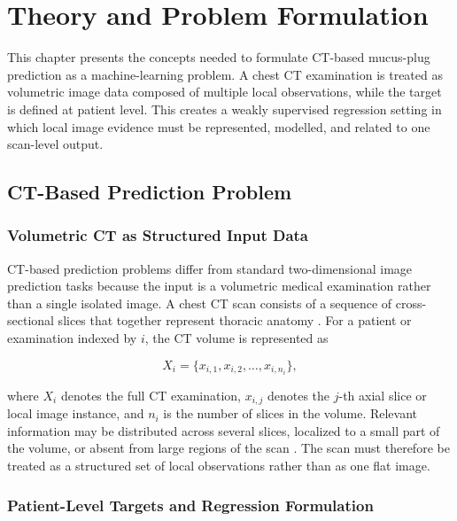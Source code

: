 \chapter{Theory and Problem Formulation}
\label{chap:theory}

This chapter presents the concepts needed to formulate CT-based mucus-plug prediction as a machine-learning problem. A chest CT examination is treated as volumetric image data composed of multiple local observations, while the target is defined at patient level. This creates a weakly supervised regression setting in which local image evidence must be represented, modelled, and related to one scan-level output.


\section{CT-Based Prediction Problem}
\label{sec:ct_based_prediction_problem}

\subsection{Volumetric CT as Structured Input Data}
\label{sec:volumetric_ct_input}

CT-based prediction problems differ from standard two-dimensional image prediction tasks because the input is a volumetric medical examination rather than a single isolated image. A chest CT scan consists of a sequence of cross-sectional slices that together represent thoracic anatomy \cite{whiting2015ctbasic,dejong2005ctairways}. For a patient or examination indexed by \(i\), the CT volume is represented as

\[
X_i = \{x_{i,1}, x_{i,2}, \dots, x_{i,n_i}\},
\]

where \(X_i\) denotes the full CT examination, \(x_{i,j}\) denotes the \(j\)-th axial slice or local image instance, and \(n_i\) is the number of slices in the volume. Relevant information may be distributed across several slices, localized to a small part of the volume, or absent from large regions of the scan \cite{xue2023copdmil,djahnine2024weakly}. The scan must therefore be treated as a structured set of local observations rather than as one flat image.

\subsection{Patient-Level Targets and Regression Formulation}
\label{sec:patient_level_regression}

